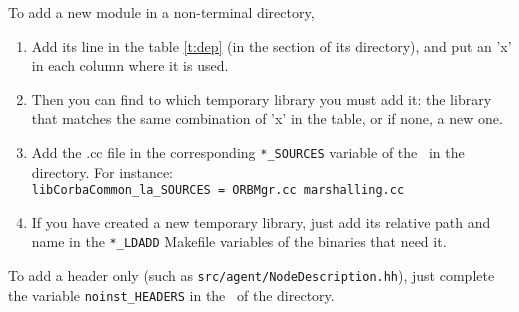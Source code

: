 \noindent
To add a new module in a non-terminal directory,
\begin{enumerate}
\item Add its line in the table \ref{t:dep} (in the section of its directory),
  and put an 'x' in each column where it is used.
\item Then you can find to which temporary library you must add it: the library
  that matches the same combination of 'x' in the table, or if none, a new one.
\item Add the \textsf{.cc} file in the corresponding \texttt{*\_SOURCES}
  variable of the \makeam\ in the directory. For instance:\\
\texttt{libCorbaCommon\_la\_SOURCES = ORBMgr.cc marshalling.cc}
\item If you have created a new temporary library, just add its relative path
  and name in the \texttt{*\_LDADD} Makefile variables of the binaries that need it.
\end{enumerate}
To add a header only (such as \texttt{src/agent/NodeDescription.hh}), just
complete the variable \texttt{noinst\_HEADERS} in the \makeam\ of the directory.
\\


